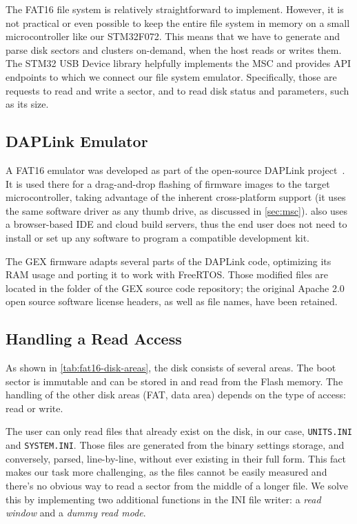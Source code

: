 The FAT16 file system is relatively straightforward to implement. However, it is not practical or even possible to keep the entire file system in memory on a small microcontroller like our STM32F072. This means that we have to generate and parse disk sectors and clusters on-demand, when the host reads or writes them. The STM32 \gls{USB} Device library helpfully implements the \gls{MSC} and provides \gls{API} endpoints to which we connect our file system emulator. Specifically, those are requests to read and write a sector, and to read disk status and parameters, such as its size.

\subsection{DAPLink Emulator}

A FAT16 emulator was developed as part of the open-source \mbed DAPLink project~\cite{daplink}. It is used there for a drag-and-drop flashing of firmware images to the target microcontroller, taking advantage of the inherent cross-platform support (it uses the same software driver as any thumb drive, as discussed in \cref{sec:msc}). \mbed also uses a browser-based \gls{IDE} and cloud build servers, thus the end user does not need to install or set up any software to program a compatible development kit.

The GEX firmware adapts several parts of the DAPLink code, optimizing its \gls{RAM} usage and porting it to work with FreeRTOS. Those modified files are located in the folder  of the GEX source code repository; the original Apache 2.0 open source software license headers, as well as file names, have been retained.

\subsection{Handling a Read Access}

As shown in \cref{tab:fat16-disk-areas}, the disk consists of several areas. The boot sector is immutable and can be stored in and read from the Flash memory. The handling of the other disk areas (\gls{FAT}, data area) depends on the type of access: read or write.

The user can only read files that already exist on the disk, in our case, \verb|UNITS.INI| and \verb|SYSTEM.INI|. Those files are generated from the binary settings storage, and conversely, parsed, line-by-line, without ever existing in their full form. This fact makes our task more challenging, as the files cannot be easily measured and there's no obvious way to read a sector from the middle of a longer file. We solve this by implementing two additional functions in the INI file writer: a \textit{read window} and a \textit{dummy read mode}.


